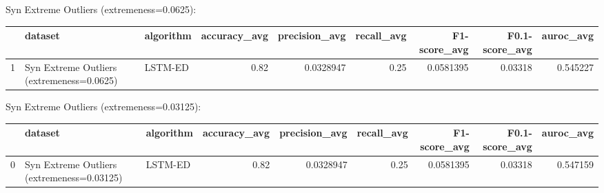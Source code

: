 Syn Extreme Outliers (extremeness=0.0625):

\begin{tabular}{rllrrrrrr}
\hline
    & dataset                                   & algorithm   &   accuracy\_avg &   precision\_avg &   recall\_avg &   F1-score\_avg &   F0.1-score\_avg &   auroc\_avg \\
\hline
  1 & Syn Extreme Outliers (extremeness=0.0625) & LSTM-ED     &           0.82 &       0.0328947 &         0.25 &      0.0581395 &          0.03318 &    0.545227 \\
\hline
\end{tabular}

Syn Extreme Outliers (extremeness=0.03125):

\begin{tabular}{rllrrrrrr}
\hline
    & dataset                                    & algorithm   &   accuracy\_avg &   precision\_avg &   recall\_avg &   F1-score\_avg &   F0.1-score\_avg &   auroc\_avg \\
\hline
  0 & Syn Extreme Outliers (extremeness=0.03125) & LSTM-ED     &           0.82 &       0.0328947 &         0.25 &      0.0581395 &          0.03318 &    0.547159 \\
\hline
\end{tabular}

